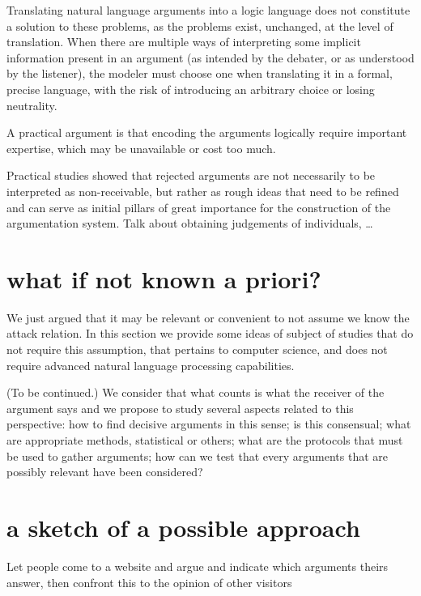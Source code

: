 \documentclass[version=3.21, pagesize, twoside=off, bibliography=totoc, DIV=calc, fontsize=12pt, a4paper, french, english]{scrartcl}
\begin{document}
Translating natural language arguments into a logic language does not constitute a solution to these problems, as the problems exist, unchanged, at the level of translation. When there are multiple ways of interpreting some implicit information present in an argument (as intended by the debater, or as understood by the listener), the modeler must choose one when translating it in a formal, precise language, with the risk of introducing an arbitrary choice or losing neutrality.

A practical argument is that encoding the arguments logically require important expertise, which may be unavailable or cost too much.


Practical studies showed that rejected arguments are not necessarily to be interpreted as non-receivable, but rather as rough ideas that need to be refined \cite{EJDP2018, Bourguet2013} and can serve as initial pillars of great importance for the construction of the argumentation system. Talk about obtaining judgements of individuals, …

\section{what if not known a priori?}
We just argued that it may be relevant or convenient to not assume we know the attack relation. In this section we provide some ideas of subject of studies that do not require this assumption, that pertains to computer science, and does not require advanced natural language processing capabilities.

(To be continued.)
We consider that what counts is what the receiver of the argument says and we propose to study several aspects related to this perspective: how to find decisive arguments in this sense; is this consensual; what are appropriate methods, statistical or others; what are the protocols that must be used to gather arguments; how can we test that every arguments that are possibly relevant have been considered?

\section{a sketch of a possible approach}
Let people come to a website and argue and indicate which arguments theirs answer, then confront this to the opinion of other visitors
\end{document}
